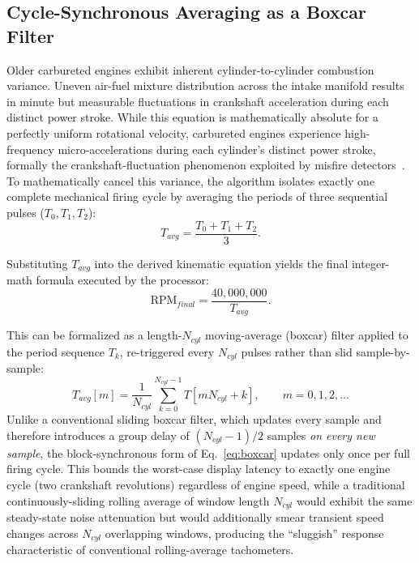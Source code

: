 \documentclass[journal, twocolumn]{IEEEtran}
\begin{document}
\subsection{Cycle-Synchronous Averaging as a Boxcar Filter}
Older carbureted engines exhibit inherent cylinder-to-cylinder combustion variance. Uneven air-fuel mixture distribution across the intake manifold results in minute but measurable fluctuations in crankshaft acceleration during each distinct power stroke. While this equation is mathematically absolute for a perfectly uniform rotational velocity, carbureted engines experience high-frequency micro-accelerations during each cylinder's distinct power stroke, formally the crankshaft-fluctuation phenomenon exploited by misfire detectors~\cite{rizzoni1989,klenk1993}. To mathematically cancel this variance, the algorithm isolates exactly one complete mechanical firing cycle by averaging the periods of three sequential pulses ($T_0, T_1, T_2$):
\begin{equation}
T_{avg} = \frac{T_0 + T_1 + T_2}{3}.
\label{eq:tavg}
\end{equation}

Substituting $T_{avg}$ into the derived kinematic equation yields the final integer-math formula executed by the processor:
\begin{equation}
\text{RPM}_{final} = \frac{40{,}000{,}000}{T_{avg}}.
\label{eq:rpm_final}
\end{equation}

This can be formalized as a length-$N_{cyl}$ moving-average (boxcar) filter applied to the period sequence $T_k$, re-triggered every $N_{cyl}$ pulses rather than slid sample-by-sample:
\begin{equation}
T_{avg}[m] = \frac{1}{N_{cyl}}\sum_{k=0}^{N_{cyl}-1} T[mN_{cyl}+k], \qquad m = 0,1,2,\ldots
\label{eq:boxcar}
\end{equation}
Unlike a conventional sliding boxcar filter, which updates every sample and therefore introduces a group delay of $(N_{cyl}-1)/2$ samples \emph{on every new sample}, the block-synchronous form of Eq.~\eqref{eq:boxcar} updates only once per full firing cycle. This bounds the worst-case display latency to exactly one engine cycle (two crankshaft revolutions) regardless of engine speed, while a traditional continuously-sliding rolling average of window length $N_{cyl}$ would exhibit the same steady-state noise attenuation but would additionally smear transient speed changes across $N_{cyl}$ overlapping windows, producing the ``sluggish'' response characteristic of conventional rolling-average tachometers.
\end{document}
